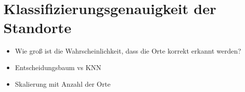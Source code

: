 \section{Klassifizierungsgenauigkeit der Standorte}
\begin{itemize}
    \item Wie groß ist die Wahrscheinlichkeit, dass die Orte korrekt erkannt werden?
    \item Entscheidungsbaum vs KNN
    \item Skalierung mit Anzahl der Orte
\end{itemize}